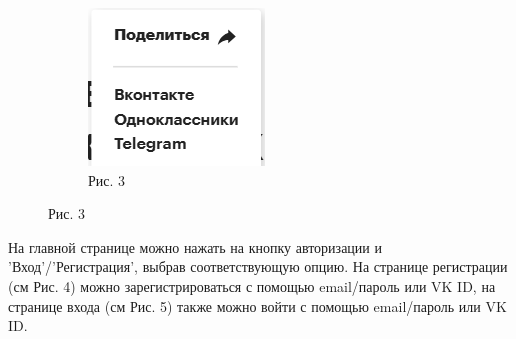 \documentclass{scrreprt}
\begin{document}
\begin{figure}[ht]
\begin{subfigure}[b]{0.4\textwidth}
 		\includegraphics[width=\textwidth]{c}
 		\caption{Рис. 3}
 	\end{subfigure}
 \end{figure}
 
 На главной странице можно нажать на кнопку авторизации и 'Вход'/'Регистрация', выбрав соответствующую опцию. На странице регистрации (см Рис. 4) можно зарегистрироваться с помощью email/пароль или VK ID, на странице входа (см Рис. 5) также можно войти с помощью email/пароль или VK ID.
 
\end{document}
